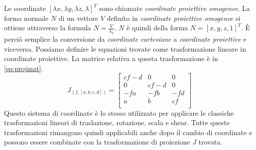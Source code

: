 Le coordinate $[\lambda x, \lambda y, \lambda z, \lambda]^T$ sono chiamate \emph{coordinate proiettive omogenee}.
La forma normale $N$ di un vettore $V$ definito in \emph{coordinate proiettive omogenee} si ottiene attraverso la formula $N = \displaystyle\frac{V}{\lambda_V}$.
$N$ è quindi della forma $N = [x, y, z, 1]^T$.
È perciò semplice la conversione da \emph{coordinate cartesiane} a \emph{coordinate proiettive} e viceversa.
Possiamo definire le equazioni trovate come trasformazione lineare in coordinate proiettive.
La matrice relativa a questa trasformazione è in \ref{eq:projmat}.
\begin{equation}
    \label{eq:projmat}
    J_{(f, [a, b, c, d])} =
    \begin{bmatrix}
        cf - d & 0      & 0   \\
        0      & cf - d & 0   \\
        -fa    & -fb    & -fd \\
        a      & b      & cf  \\
    \end{bmatrix}
\end{equation}
Questo sistema di coordinate è lo stesso utilizzato per applicare le classiche trasformazioni lineari di traslazione, rotazione, scala e shear.
Tutte queste trasformazioni rimangono quindi applicabili anche dopo il cambio di coordinate e possono essere combinate con la trasformazione di proiezione $J$ trovata.

